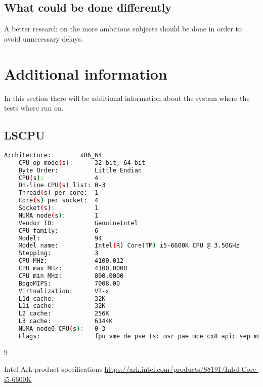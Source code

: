 \documentclass[a4paper]{article}
\begin{document}
\subsection{What could be done differently}
A better research on the more ambitious subjects should be done in order to avoid unnecessary delays.

\newpage
\section{Additional information}
In this section there will be additional information about the system where the tests where run on.
\subsection{LSCPU}
\begin{lstlisting}[language=bash]
	Architecture:        x86_64
	CPU op-mode(s):      32-bit, 64-bit
	Byte Order:          Little Endian
	CPU(s):              4
	On-line CPU(s) list: 0-3
	Thread(s) per core:  1
	Core(s) per socket:  4
	Socket(s):           1
	NUMA node(s):        1
	Vendor ID:           GenuineIntel
	CPU family:          6
	Model:               94
	Model name:          Intel(R) Core(TM) i5-6600K CPU @ 3.50GHz
	Stepping:            3
	CPU MHz:             4100.012
	CPU max MHz:         4100.0000
	CPU min MHz:         800.0000
	BogoMIPS:            7008.00
	Virtualization:      VT-x
	L1d cache:           32K
	L1i cache:           32K
	L2 cache:            256K
	L3 cache:            6144K
	NUMA node0 CPU(s):   0-3
	Flags:               fpu vme de pse tsc msr pae mce cx8 apic sep mtrr pge mca cmov pat pse36 clflush dts acpi mmx fxsr sse sse2 ss ht tm pbe syscall nx pdpe1gb rdtscp lm constant_tsc art arch_perfmon pebs bts rep_good nopl xtopology nonstop_tsc cpuid aperfmperf tsc_known_freq pni pclmulqdq dtes64 monitor ds_cpl vmx est tm2 ssse3 sdbg fma cx16 xtpr pdcm pcid sse4_1 sse4_2 x2apic movbe popcnt aes xsave avx f16c rdrand lahf_lm abm 3dnowprefetch cpuid_fault invpcid_single pti tpr_shadow vnmi flexpriority ept vpid fsgsbase tsc_adjust bmi1 hle avx2 smep bmi2 erms invpcid rtm mpx rdseed adx smap clflushopt intel_pt xsaveopt xsavec xgetbv1 xsaves dtherm ida arat pln pts hwp hwp_notify hwp_act_window hwp_epp

\end{lstlisting}

\begin{thebibliography}{9}

	Intel
	Ark product specifications
	\url{https://ark.intel.com/products/88191/Intel-Core-i5-6600K}
	
\end{thebibliography}
\end{document}
